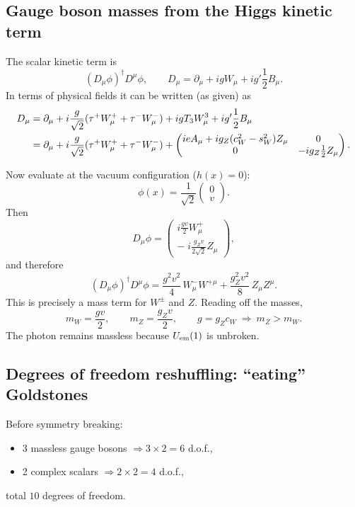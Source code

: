 \subsection{Gauge boson masses from the Higgs kinetic term}
The scalar kinetic term is
\begin{equation}
(D_\mu\phi)^\dagger D^\mu\phi,
\qquad
D_\mu=\partial_\mu+igW_\mu+ig'\frac{1}{2}B_\mu.
\end{equation}
In terms of physical fields it can be written (as given) as
\begin{equation}
\begingroup\setlength{\jot}{2pt}
\begin{aligned}
D_\mu
&=
\partial_\mu
+i\frac{g}{\sqrt{2}}(\tau^+W^+_\mu+\tau^-W^-_\mu)
+igT_3 W^3_\mu+ig'\frac{1}{2}B_\mu
\\
&=
\partial_\mu
+i\frac{g}{\sqrt{2}}(\tau^+W^+_\mu+\tau^-W^-_\mu)
+\begin{pmatrix}
ieA_\mu+ig_Z(c_W^2-s_W^2)Z_\mu & 0\\
0 & -ig_Z\frac{1}{2}Z_\mu
\end{pmatrix}.
\end{aligned}
\endgroup
\end{equation}

Now evaluate at the vacuum configuration ($h(x)=0$):
\[
\phi(x)=\frac{1}{\sqrt{2}}
\begin{pmatrix}
0\\ v
\end{pmatrix}.
\]
Then
\begin{equation}
D_\mu\phi=
\begin{pmatrix}
i\frac{gv}{2}W^+_\mu\\[1mm]
-\;i\frac{g_Z v}{2\sqrt{2}}Z_\mu
\end{pmatrix},
\end{equation}
and therefore
\begin{equation}
(D_\mu\phi)^\dagger D^\mu\phi
=
\frac{g^2v^2}{4}\,W^-_\mu W^{+\mu}
+\frac{g_Z^2v^2}{8}\,Z_\mu Z^\mu.
\end{equation}
This is precisely a mass term for $W^\pm$ and $Z$. Reading off the masses,
\begin{equation}
\boxed{
m_W=\frac{gv}{2},
\qquad
m_Z=\frac{g_Z v}{2},
\qquad
g=g_Z c_W\ \Rightarrow\ m_Z>m_W.
}
\label{eq:mW-mZ}
\end{equation}
The photon remains massless because $U_{\rm em}(1)$ is unbroken.

\subsection{Degrees of freedom reshuffling: ``eating'' Goldstones}
Before symmetry breaking:
\begin{itemize}
  \item 3 massless gauge bosons $\Rightarrow 3\times 2=6$ d.o.f.,
  \item 2 complex scalars $\Rightarrow 2\times 2=4$ d.o.f.,
\end{itemize}
total $10$ degrees of freedom.

